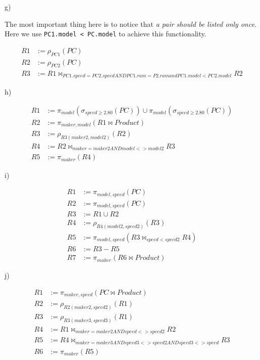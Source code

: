 g)

The most important thing here is to notice that \emph{a pair
should be listed only once}. Here we use \verb|PC1.model < PC.model|
to achieve this functionality.

\begin{align*}
  R1 &:= \rho_{PC1}(PC) \\
  R2 &:= \rho_{PC2}(PC) \\
  R3 &:= R1 \bowtie_{PC1.speed = PC2.speed AND PC1.ram =
         P2.ram and PC1.model < PC2.model} R2
\end{align*}

h)

\begin{align*}
  R1 &:= \pi_{model}(\sigma_{speed \geq 2.80}(PC))
  \cup \pi_{model}(\sigma_{speed \geq 2.80}(PC)) \\
  R2 &:= \pi_{maker, model}(R1 \bowtie Product) \\
  R3 &:= \rho_{R3(maker2, model2)}(R2) \\
  R4 &:= R2 \bowtie_{maker = maker2 AND model <> model2} R3 \\
  R5 &:= \pi_{maker}(R4)
\end{align*}

i)

\begin{align*}
  R1 &:= \pi_{model, speed}(PC) \\
  R2 &:= \pi_{model, speed}(PC) \\
  R3 &:= R1 \cup R2 \\
  R4 &:= \rho_{R4(model2, speed2)}(R3) \\
  R5 &:= \pi_{model, speed}(R3 \bowtie_{speed < speed2} R4) \\
  R6 &:= R3 - R5 \\
  R7 &:= \pi_{maker}(R6 \bowtie Product)
\end{align*}

j)

\begin{align*}
  R1 &:= \pi_{maker, speed}(PC \bowtie Product) \\
  R2 &:= \rho_{R2(maker2, speed2)}(R1) \\
  R3 &:= \rho_{R3(maker3, speed3)}(R1) \\
  R4 &:= R1 \bowtie_{maker = maker2 AND speed <> speed2} R2 \\
  R5 &:= R4 \bowtie_{maker = maker3 AND speed3 <> speed2
         AND speed3 <> speed} R3 \\
  R6 &:= \pi_{maker}(R5)
\end{align*}

